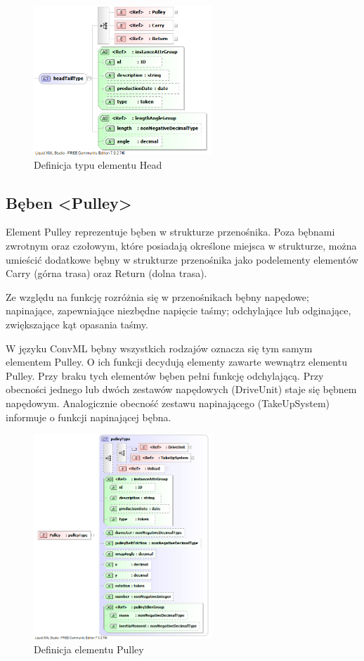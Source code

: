 \documentclass[12pt,a4paper]{article}
\begin{document}
\begin{figure}[H]
  \centering
  \includegraphics[width=0.6\textwidth]{png/liquid/headTailType}
  \caption{Definicja typu elementu Head}
  \label{fig:headTailType-xsd}
\end{figure}


\subsection{Bęben <Pulley>}
Element Pulley reprezentuje bęben w strukturze przenośnika.  Poza bębnami
zwrotnym oraz czołowym, które posiadają określone miejsca w strukturze, można
umieścić dodatkowe bębny w strukturze przenośnika jako podelementy elementów
Carry (górna trasa) oraz Return (dolna trasa).

Ze względu na funkcję rozróżnia się w przenośnikach bębny napędowe; napinające,
zapewniające niezbędne napięcie taśmy; odchylające lub odginające, zwiększające
kąt opasania taśmy.

W języku ConvML bębny wszystkich rodzajów oznacza się tym samym elementem
Pulley.  O ich funkcji decydują elementy zawarte wewnątrz elementu Pulley. Przy
braku tych elementów bęben pełni funkcję odchylającą.  Przy obecności jednego
lub dwóch zestawów napędowych (DriveUnit) staje się bębnem napędowym.
Analogicznie obecność zestawu napinającego (TakeUpSystem) informuje o funkcji
napinającej bębna.

\begin{figure}[H]
  \centering
  \includegraphics[width=0.6\textwidth]{png/liquid/Pulley}
  \caption{Definicja elementu Pulley}
  \label{fig:pulley-xsd}
\end{figure}
\end{document}
